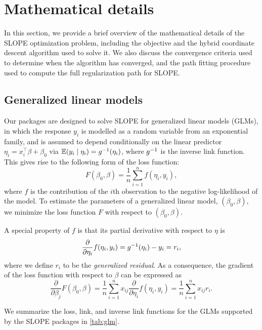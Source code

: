 \documentclass[a4paper,fleqn]{cas-sc}
\begin{document}
\section{Mathematical details}
\label{sec:math-details}

In this section, we provide a brief overview of the mathematical details of the
SLOPE optimization problem, including the objective and the hybrid coordinate
descent algorithm used to solve it. We also discuss the convergence criteria
used to determine when the algorithm has converged, and the path fitting
procedure used to compute the full regularization path for SLOPE.

\subsection{Generalized linear models}

Our packages are designed to solve SLOPE for generalized linear models (GLMs),
in which the response \(y_i\) is modelled as a random variable from an
exponential family, and is assumed to depend conditionally on the linear
predictor \(\eta_i = x_i^\intercal \beta + \beta_0\) via
\(\mathbb{E}(y_i \mid \eta_i) = g^{-1}(\eta_i)\), where \(g^{-1}\) is the
inverse link function. This gives rise to the following form of the loss
function:
\[
  F( \beta_0, \beta ) = \frac{1}{n} \sum_{i=1}^n f( \eta_i, y_i),
\]
where \(f\) is the contribution of the \(i\)th observation to the negative
log-likelihood of the model. To estimate the parameters of a generalized linear
model, \((\beta_0, \beta)\), we minimize the loss function \(F\) with respect to
\((\beta_0, \beta)\).

A special property of \(f\) is that its partial derivative with respect to
\(\eta\) is
\[
  \frac{\partial}{\partial \eta_i} f( \eta_i, y_i) = g^{-1} ( \eta_i) - y_i
                                                   = r_i,
\]
where we define \(r_i\) to be the \emph{generalized residual}. As a consequence,
the gradient of the loss function with respect to \(\beta\) can be expressed as
\[
  \frac{\partial}{\partial \beta_j} F( \beta_0, \beta )
  = \frac{1}{n} \sum_{i=1}^n x_{ij} \frac{\partial}{\partial \eta_i} f( \eta_i, y_i)
  = \frac{1}{n} \sum_{i=1}^n x_{ij} r_i.
\]

We summarize the loss, link, and inverse link functions for the GLMs supported
by the SLOPE packages in \autoref{tab:glm}.
\end{document}
